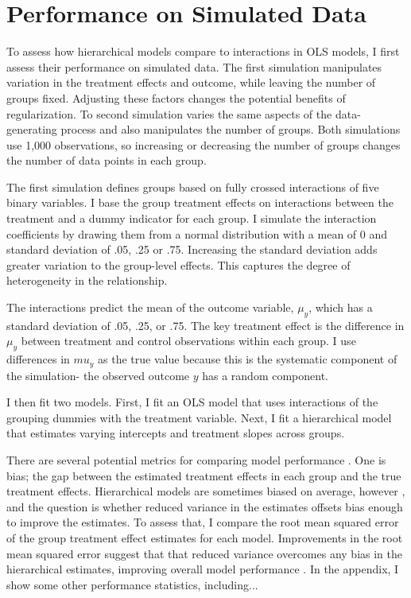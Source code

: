 \documentclass[12pt]{article}
\begin{document}
\section{Performance on Simulated Data}

To assess how hierarchical models compare to interactions in OLS models, I first assess their performance on simulated data. 
The first simulation manipulates variation in the treatment effects and outcome, while leaving the number of groups fixed.
Adjusting these factors changes the potential benefits of regularization.
To second simulation varies the same aspects of the data-generating process and also manipulates the number of groups.
Both simulations use 1,000 observations, so increasing or decreasing the number of groups changes the number of data points in each group.


The first simulation defines groups based on fully crossed interactions of five binary variables. 
I base the group treatment effects on interactions between the treatment and a dummy indicator for each group. 
I simulate the interaction coefficients by drawing them from a normal distribution with a mean of 0 and standard deviation of .05, .25 or .75. 
Increasing the standard deviation adds greater variation to the group-level effects.
This captures the degree of heterogeneity in the relationship.


The interactions predict the mean of the outcome variable, $\mu_y$, which has a standard deviation of .05, .25, or .75. 
The key treatment effect is the difference in $\mu_y$ between treatment and control observations within each group. 
I use differences in $mu_y$ as the true value because this is the systematic component of the simulation- the observed outcome $y$ has a random component. 


I then fit two models. 
First, I fit an OLS model that uses interactions of the grouping dummies with the treatment variable.
Next, I fit a hierarchical model that estimates varying intercepts and treatment slopes across groups.


There are several potential metrics for comparing model performance \citep{Hopkinsetal2024}.
One is bias; the gap between the estimated treatment effects in each group and the true treatment effects. 
Hierarchical models are sometimes biased on average, however \citep{CliffordRainey2024}, and the question is whether reduced variance in the estimates offsets bias enough to improve the estimates.
To assess that, I compare the root mean squared error of the group treatment effect estimates for each model. 
Improvements in the root mean squared error suggest that that reduced variance overcomes any bias in the hierarchical estimates, improving overall model performance \citep[pg. 39]{Hopkinsetal2024}.
In the appendix, I show some other performance statistics, including...
\end{document}
